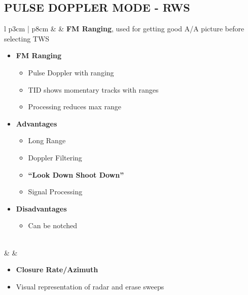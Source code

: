 \documentclass[8pt,usenames,dvipsnames,twoside]{article}
\begin{document}
		\subsection{PULSE DOPPLER MODE - RWS}
		\label{sec:awg9-rws}
		\begin{center}
			\begin{longtable}{l p{3cm} | p{8cm}}
				\toprule
				\textbullet &  & \textbf{FM Ranging}, used for getting good A/A picture before selecting TWS
				
				\begin{minipage}[t]{\linewidth}
					\vspace{-7pt}
					\begin{itemize}
						\item \textbf{FM Ranging}
						\begin{itemize}
							\item Pulse Doppler with ranging
							\item TID shows momentary tracks with ranges
							\item Processing reduces max range
						\end{itemize}
						\item \textbf{Advantages}
						\begin{itemize}
							\item Long Range
							\item Doppler Filtering
							\item \textbf{``Look Down Shoot Down''}
							\item Signal Processing 
						\end{itemize}
						\item \textbf{Disadvantages}
						\begin{itemize}
							\item Can be notched
						\end{itemize}
					\end{itemize}
				\end{minipage} \\
				\midrule
				\textbullet &  & 
				\begin{minipage}[t]{\linewidth}
					\vspace{-7pt}
					\begin{itemize}
						\item \textbf{Closure Rate/Azimuth}
						\item Visual representation of radar and erase sweeps
					\end{itemize}
				\end{minipage} \\

\end{longtable}
\end{center}
\end{document}
